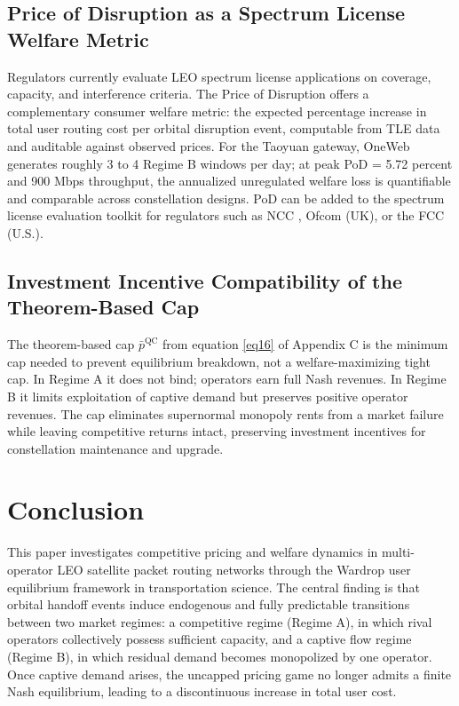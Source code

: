 \documentclass[review,3p,authoryear]{elsarticle}
\begin{document}
\subsection{Price of Disruption as a Spectrum License Welfare Metric}

Regulators currently evaluate LEO spectrum license applications on coverage, capacity, and interference criteria. The Price of Disruption offers a complementary consumer welfare metric: the expected percentage increase in total user routing cost per orbital disruption event, computable from TLE data and auditable against observed prices. For the Taoyuan gateway, OneWeb generates roughly 3 to 4 Regime B windows per day; at peak PoD = 5.72 percent and 900 Mbps throughput, the annualized unregulated welfare loss is quantifiable and comparable across constellation designs. PoD can be added to the spectrum license evaluation toolkit for regulators such as NCC \citep{NCCT}, Ofcom (UK), or the FCC (U.S.).

\subsection{Investment Incentive Compatibility of the Theorem-Based Cap}

The theorem-based cap $\bar{p}^{\mathrm{QC}}$ from equation \eqref{eq16} of Appendix C is the minimum cap needed to prevent equilibrium breakdown, not a welfare-maximizing tight cap. In Regime A it does not bind; operators earn full Nash revenues. In Regime B it limits exploitation of captive demand but preserves positive operator revenues. The cap eliminates supernormal monopoly rents from a market failure while leaving competitive returns intact, preserving investment incentives for constellation maintenance and upgrade.

\section{Conclusion}

This paper investigates competitive pricing and welfare dynamics in multi-operator LEO satellite packet routing networks through the Wardrop user equilibrium framework in transportation science. The central finding is that orbital handoff events induce endogenous and fully predictable transitions between two market regimes: a competitive regime (Regime A), in which rival operators collectively possess sufficient capacity, and a captive flow regime (Regime B), in which residual demand becomes monopolized by one operator. Once captive demand arises, the uncapped pricing game no longer admits a finite Nash equilibrium, leading to a discontinuous increase in total user cost.
\end{document}
